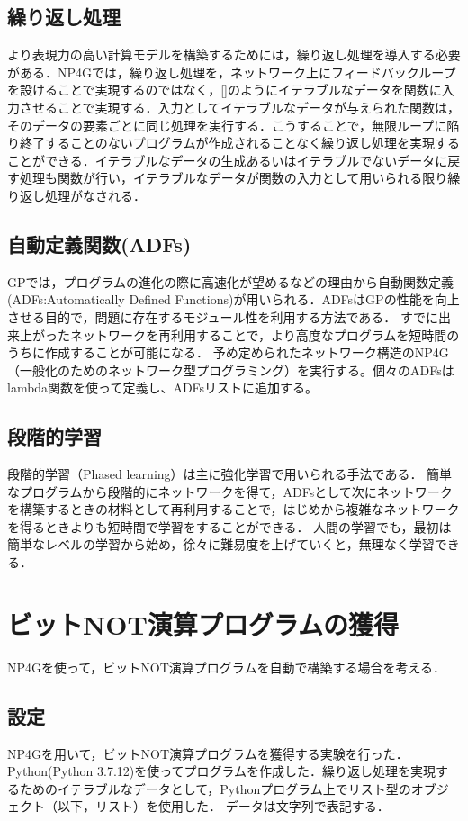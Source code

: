 \documentclass[exploratorypaper]{jsaiart} %
\begin{document}
\subsection{繰り返し処理}
より表現力の高い計算モデルを構築するためには，繰り返し処理を導入する必要がある．NP4Gでは，繰り返し処理を，ネットワーク上にフィードバックループを設けることで実現するのではなく，[]のようにイテラブルなデータを関数に入力させることで実現する．入力としてイテラブルなデータが与えられた関数は，そのデータの要素ごとに同じ処理を実行する．こうすることで，無限ループに陥り終了することのないプログラムが作成されることなく繰り返し処理を実現することができる．イテラブルなデータの生成あるいはイテラブルでないデータに戻す処理も関数が行い，イテラブルなデータが関数の入力として用いられる限り繰り返し処理がなされる．

\subsection{自動定義関数(ADFs)}
GPでは，プログラムの進化の際に高速化が望めるなどの理由から自動関数定義(ADFs:Automatically Defined Functions)\cite{adfs}が用いられる．ADFsはGPの性能を向上させる目的で，問題に存在するモジュール性を利用する方法である．
すでに出来上がったネットワークを再利用することで，より高度なプログラムを短時間のうちに作成することが可能になる．
予め定められたネットワーク構造のNP4G（一般化のためのネットワーク型プログラミング）を実行する。個々のADFsはlambda関数を使って定義し、ADFsリストに追加する。


\subsection{段階的学習}
段階的学習（Phased learning）は主に強化学習で用いられる手法である\cite{hodohara2012reinforcement}．
簡単なプログラムから段階的にネットワークを得て，ADFsとして次にネットワークを構築するときの材料として再利用することで，はじめから複雑なネットワークを得るときよりも短時間で学習をすることができる．
人間の学習でも，最初は簡単なレベルの学習から始め，徐々に難易度を上げていくと，無理なく学習できる．

\section{ビットNOT演算プログラムの獲得}
NP4Gを使って，ビットNOT演算プログラムを自動で構築する場合を考える．

\subsection{設定}
NP4Gを用いて，ビットNOT演算プログラムを獲得する実験を行った．
Python(Python 3.7.12)を使ってプログラムを作成した．繰り返し処理を実現するためのイテラブルなデータとして，Pythonプログラム上でリスト型のオブジェクト（以下，リスト）を使用した．
データは文字列で表記する．
\end{document}
